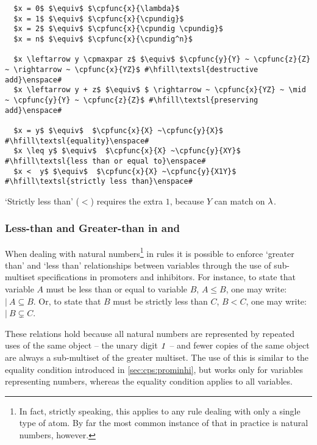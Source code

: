 \lstset{xleftmargin=.5in, xrightmargin=.5in} 
\begin{lstlisting}
  $x = 0$ $\equiv$ $\cpfunc{x}{\lambda}$
  $x = 1$ $\equiv$ $\cpfunc{x}{\cpundig}$
  $x = 2$ $\equiv$ $\cpfunc{x}{\cpundig \cpundig}$
  $x = n$ $\equiv$ $\cpfunc{x}{\cpundig^n}$
  
  $x \leftarrow y \cpmaxpar z$ $\equiv$ $\cpfunc{y}{Y} ~ \cpfunc{z}{Z} ~ \rightarrow ~ \cpfunc{x}{YZ}$ #\hfill\textsl{destructive add}\enspace#
  $x \leftarrow y + z$ $\equiv$ $ \rightarrow ~ \cpfunc{x}{YZ} ~ \mid ~ \cpfunc{y}{Y} ~ \cpfunc{z}{Z}$ #\hfill\textsl{preserving add}\enspace#
  
  $x = y$ $\equiv$  $\cpfunc{x}{X} ~\cpfunc{y}{X}$ #\hfill\textsl{equality}\enspace#
  $x \leq y$ $\equiv$  $\cpfunc{x}{X} ~\cpfunc{y}{XY}$ #\hfill\textsl{less than or equal to}\enspace#
  $x <  y$ $\equiv$  $\cpfunc{x}{X} ~\cpfunc{y}{X1Y}$ #\hfill\textsl{strictly less than}\enspace#
\end{lstlisting}
\noindent
`Strictly less than' (\(<\)) requires the extra \(1\), because \(Y\) can match on \(\lambda\).

\subsubsection{Less-than and Greater-than in  and }

When dealing with natural numbers\footnote{In fact, strictly speaking, this applies to any rule dealing with only a single type of atom.  By far the most common instance of that in practice is natural numbers, however.} in rules it is possible to enforce `greater than' and `less than' relationships between variables through the use of sub-multiset specifications in promoters and \glspl{inhibitor}.  For instance, to state that variable \(A\) must be less than or equal to variable \(B\), \ie{} \(A \leq B\), one may write: \(|~ A \subseteq B\).  Or, to state that \(B\) must be strictly less than \(C\), \ie{} \(B < C\), one may write: \(|~ B \subsetneq C\).

These relations hold because all natural numbers are represented by repeated uses of the same object -- the unary digit \(\mathit{1}\) -- and fewer copies of the same object are always a sub-multiset of the greater multiset.  The use of this is similar to the equality condition introduced in \cref{sec:cps:prominhi}, but works only for variables representing numbers, whereas the equality condition applies to all variables. 

